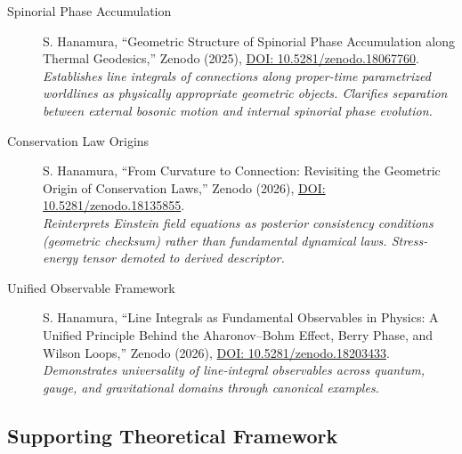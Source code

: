 \documentclass[12pt,letterpaper]{article}
\begin{document}
\begin{description}
\item[Spinorial Phase Accumulation] S. Hanamura, ``Geometric Structure of Spinorial Phase Accumulation along Thermal Geodesics,'' Zenodo (2025), \href{https://doi.org/10.5281/zenodo.18067760}{DOI: 10.5281/zenodo.18067760}. \\
\textit{Establishes line integrals of connections along proper-time parametrized worldlines as physically appropriate geometric objects. Clarifies separation between external bosonic motion and internal spinorial phase evolution.}

\item[Conservation Law Origins] S. Hanamura, ``From Curvature to Connection: Revisiting the Geometric Origin of Conservation Laws,'' Zenodo (2026), \href{https://doi.org/10.5281/zenodo.18135855}{DOI: 10.5281/zenodo.18135855}. \\
\textit{Reinterprets Einstein field equations as posterior consistency conditions (geometric checksum) rather than fundamental dynamical laws. Stress-energy tensor demoted to derived descriptor.}

\item[Unified Observable Framework] S. Hanamura, ``Line Integrals as Fundamental Observables in Physics: A Unified Principle Behind the Aharonov--Bohm Effect, Berry Phase, and Wilson Loops,'' Zenodo (2026), \href{https://doi.org/10.5281/zenodo.18203433}{DOI: 10.5281/zenodo.18203433}. \\
\textit{Demonstrates universality of line-integral observables across quantum, gauge, and gravitational domains through canonical examples.}
\end{description}


\subsection*{Supporting Theoretical Framework}
\end{document}
